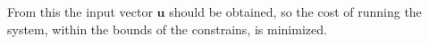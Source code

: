 From this the input vector $\pmb{u}$ should be obtained, so the cost of running the system, within the bounds of the constrains, is minimized. 





